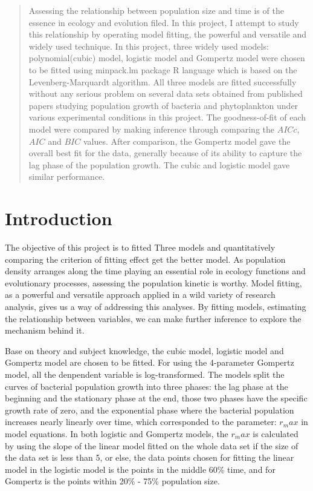 \documentclass[11pt, a4paper]{article}
\date{1/21/2021}
\begin{document}

\linenumbers


\begin{abstract}
Assessing the relationship between population size and time is of the essence in ecology and evolution filed. In this project, I attempt to study this relationship by operating model fitting, the powerful and versatile and widely used technique. In this project, three widely used models: polynomial(cubic) model, logistic model and Gompertz model were chosen to be fitted using minpack.lm package R language which is based on the Levenberg-Marquardt algorithm. All three models are fitted successfully without any serious problem on several data sets obtained from published papers studying population growth of bacteria and phytoplankton under various experimental conditions in this project. The goodness-of-fit of each model were compared by making inference through comparing the $AICc$, $AIC$ and $BIC$ values. After comparison, the Gompertz model gave the overall best fit for the data, generally because of its ability to capture the lag phase of the population growth. The cubic and logistic model gave similar performance.
\end{abstract}

\section{Introduction}
The objective of this project is to fitted Three models and quantitatively comparing the criterion of fitting effect get the better model. As population density arranges along the time playing an essential role in ecology functions and evolutionary processes, assessing the population kinetic is worthy. Model fitting, as a powerful and versatile approach applied in a wild variety of research analysis, gives us a way of addressing this analyses. By fitting models, estimating the relationship between variables, we can make further inference to explore the mechanism behind it. 

Base on theory and subject knowledge, the cubic model, logistic model and Gompertz model\citep{zwietering1990modeling} are chosen to be fitted. For using the 4-parameter Gompertz model, all the denpendent variable is log-transformed\citep{tjorve2017use}. The models split the curves of bacterial population growth into three phases: the lag phase at the beginning and the stationary phase at the end, those two phases have the specific growth rate of zero, and the exponential phase where the bacterial population increases nearly linearly over time, which corresponded to the parameter: $r_max$ in model  equations. In both logistic and Gompertz models, the $r_max$ is calculated by using the slope of the linear model fitted on the whole data set if the size of the data set is less than 5, or else, the data points chosen for fitting the linear model in the logistic model is the points in the middle 60\% time, and for Gompertz is the points within 20\% - 75\% population size. 
\end{document}

